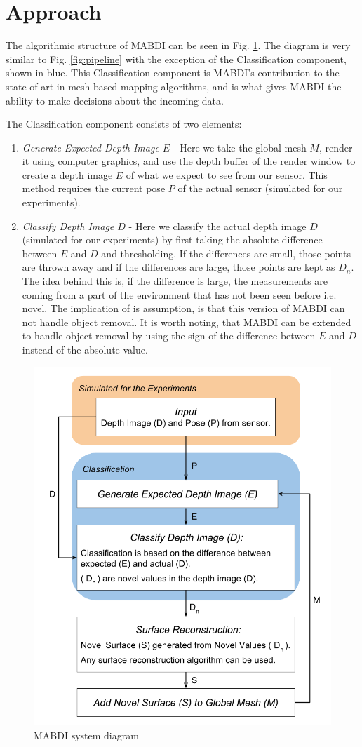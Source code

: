 \section{Approach}	\label{sec:related_works}

The algorithmic structure of MABDI can be seen in Fig. \ref{fig:system}. The diagram is very similar to Fig. \ref{fig:pipeline} with the exception of the Classification component, shown in blue. This Classification component is MABDI's contribution to the state-of-art in mesh based mapping algorithms, and is what gives MABDI the ability to make decisions about the incoming data.

The Classification component consists of two elements:
\begin{enumerate}
    \item \textit{Generate Expected Depth Image $E$} - Here we take the global
    mesh $M$, render it using computer graphics, and use the depth buffer of the
    render window to create a depth image $E$ of what we expect to see from our
    sensor. This method requires the current pose $P$ of the actual sensor
    (simulated for our experiments).
    \item \textit{Classify Depth Image $D$} - Here we classify the actual depth
    image $D$ (simulated for our experiments) by first taking the absolute
    difference between $E$ and $D$ and thresholding. If the differences are
    small, those points are thrown away and if the differences are large, those
    points are kept as $D_n$. The idea behind this is, if the difference is
    large, the measurements are coming from a part of the environment that has
    not been seen before i.e. novel. The implication of is assumption, is that
    this version of MABDI can not handle object removal. It is worth noting,
    that MABDI can be extended to handle object removal by using the sign of the
    difference between $E$ and $D$ instead of the absolute value.
\end{enumerate}

\begin{figure}[h]%
\centering
\includegraphics[width=.5\textwidth]{figures/diagram_system.png}
\caption{MABDI system diagram}
\label{fig:system}
\end{figure}



